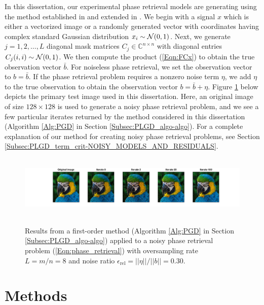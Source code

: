 In this dissertation, our experimental phase retrieval models are generating using the method established in \cite{DBLP:journals/tit/CandesLS15} and extended in \cite{DBLP:journals/siamsc/FriedlanderM16}.  
We begin with a signal $x$ which is either a vectorized image or a randomly generated vector with coordinates having complex standard Gaussian distribution $x_i \sim {\mathcal N}(0, 1)$.
Next, we generate $j = 1, 2, \ldots,  L$ diagonal mask matrices $C_j \in \mathbb{C}^{n \times n}$ with diagonal entries $C_j(i,i) \sim {\mathcal N}(0, 1)$.
We then compute the product (\ref{Eqn:FCx}) to obtain the true observation vector $\bar{b}$.
For noiseless phase retrieval, we set the observation vector to $b = \bar{b}$.
If the phase retrieval problem requires a nonzero noise term $\eta$, we add $\eta$ to the true observation to obtain the observation vector $b = \bar{b} + \eta$.
Figure \ref{Fig:parrot_signal_iterates} below depicts the primary test image used in this dissertation.
Here, an original image of size $128 \times 128$ is used to generate a noisy phase retrieval problem, and we see a few particular iterates returned by the method considered in this dissertation (Algorithm \ref{Alg:PGD} in Section \ref{Subsec:PLGD_algo-algo}).  
For a complete explanation of our method for creating noisy phase retrieval problems, see Section \ref{Subsec:PLGD_term_crit-NOISY_MODELS_AND_RESIDUALS}.

\begin{figure}[H]
\centering
\hbox{\hspace{-2.3cm} \includegraphics[scale=0.55]{parrot_signal_iterates} }
\caption{Results from a first-order method (Algorithm \ref{Alg:PGD} in Section \ref{Subsec:PLGD_algo-algo}) applied to a noisy phase retrieval problem (\ref{Eqn:phase_retrieval}) with oversampling rate $L = m/n=8$ and noise ratio $\epsilon_\text{rel} = ||\eta|| / ||b|| = 0.30$.}
\label{Fig:parrot_signal_iterates}
\end{figure}




\section{Methods}  	\label{Subsec:phase_retrieval-survey_of_methods}

